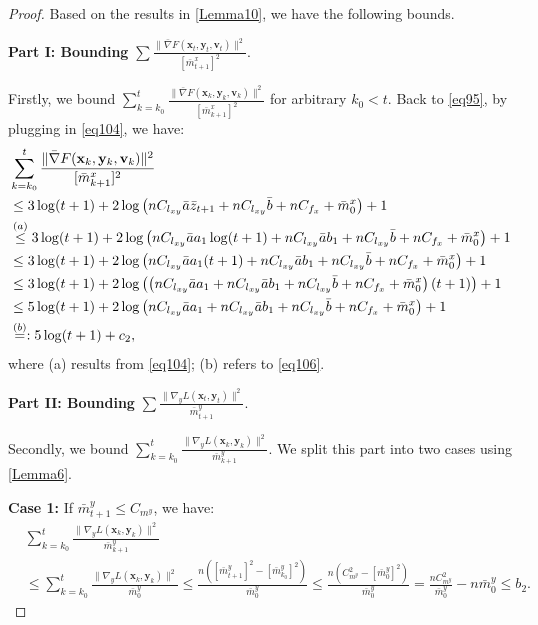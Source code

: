 \documentclass{article}
\theoremstyle{plain}
\theoremstyle{definition}
\theoremstyle{remark}
\begin{document}
\begin{proof}
Based on the results in \cref{Lemma10}, we have the following bounds.

\textbf{Part I: Bounding} $\sum \frac{\| \bar{\nabla} F(\mathbf{x}_{t},\mathbf{y}_{t},\mathbf{v}_{t})\|^2}{[\bar{m}^x_{t+1}]^2}$.

Firstly, we bound $\sum_{k=k_0}^t \frac{\| \bar{\nabla} F(\mathbf{x}_{k},\mathbf{y}_{k},\mathbf{v}_{k})\|^2}{[\bar{m}^x_{k+1}]^2}$ for arbitrary $k_0 < t$. Back to \cref{eq95}, by plugging in \cref{eq104}, we have:
\begin{align}
&\sum_{k=k_0}^t \frac{\| \bar{\nabla} F(\mathbf{x}_{k},\mathbf{y}_{k},\mathbf{v}_{k})\|^2}{[\bar{m}^x_{k+1}]^2}\notag\\
&\leq 3 \log(t + 1) + 2 \log \left( nC_{l_{xy}} \bar{a} \bar{z}_{t+1} + nC_{l_{xy}} \bar{b} + nC_{f_x} +\bar{m}^x_0 \right) + 1 \notag \\
&\overset{(a)}{\leq} 3 \log(t + 1) + 2 \log \left( nC_{l_{xy}} \bar{a} a_1 \log(t+1)+nC_{l_{xy}} \bar{a}b_1 + nC_{l_{xy}} \bar{b} + nC_{f_x} +\bar{m}^x_0 \right) + 1 \notag \\
&\leq 3 \log(t + 1) + 2 \log \left( nC_{l_{xy}} \bar{a} a_1 (t+1)+nC_{l_{xy}} \bar{a}b_1 + nC_{l_{xy}} \bar{b} + nC_{f_x} +\bar{m}^x_0 \right) + 1 \notag \\
&\leq 3 \log(t + 1) + 2 \log \left( \left(nC_{l_{xy}} \bar{a} a_1+nC_{l_{xy}} \bar{a}b_1 + nC_{l_{xy}} \bar{b} + nC_{f_x} +\bar{m}^x_0 \right)(t + 1) \right) + 1 \notag \\
&\leq 5 \log(t + 1) + 2 \log \left( nC_{l_{xy}} \bar{a} a_1+nC_{l_{xy}} \bar{a}b_1 + nC_{l_{xy}} \bar{b} + nC_{f_x} +\bar{m}^x_0\right) + 1 \notag \\
&\overset{(b)}{=}: 5 \log(t + 1) + c_2, \label{eq107}
\end{align}
where (a) results from \cref{eq104}; (b) refers to \cref{eq106}.

\textbf{Part II: Bounding} $\sum\frac{\|\nabla_y L(\mathbf{x}_t, \mathbf{y}_t)\|^2}{\bar{m}^y_{t+1}}$.

Secondly, we bound $\sum_{k=k_0}^t\frac{\|\nabla_y L(\mathbf{x}_k, \mathbf{y}_k)\|^2}{\bar{m}^y_{k+1}}$. We split this part into two cases using \cref{Lemma6}.

\textbf{Case 1:} If $\bar{m}^y_{t+1} \leq C_{m^y}$, we have:
\begin{align}
&\sum_{k=k_0}^t \frac{\|\nabla_y L(\mathbf{x}_k, \mathbf{y}_k)\|^2}{\bar{m}^y_{k+1}} \nonumber\\
&\leq \sum_{k=k_0}^t \frac{\|\nabla_y L(\mathbf{x}_k, \mathbf{y}_k)\|^2}{\bar{m}^y_{0}}\leq \frac{n([\bar{m}^y_{t+1}]^2 - [\bar{m}^y_{k_0}]^2)}{\bar{m}^y_0} \leq \frac{n(C_{m^y}^2 - [\bar{m}^y_{0}]^2)}{\bar{m}^y_{0}} = \frac{nC_{m^y}^2}{\bar{m}^y_{0}} - n\bar{m}^y_{0}\! \leq \!b_2.\label{eq108}
\end{align}


\end{proof}
\end{document}
